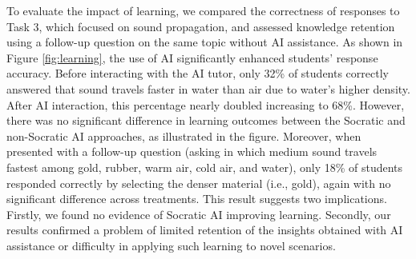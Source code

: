 \documentclass[
  11pt,
]{article}
\begin{document}
To evaluate the impact of learning, we compared the correctness of responses to Task 3, which focused on sound propagation, and assessed knowledge retention using a follow-up question on the same topic without AI assistance. As shown in Figure \ref{fig:learning}, the use of AI significantly enhanced students' response accuracy. Before interacting with the AI tutor, only 32\% of students correctly answered that sound travels faster in water than air due to water's higher density. After AI interaction, this percentage nearly doubled increasing to 68\%. However, there was no significant difference in learning outcomes between the Socratic and non-Socratic AI approaches, as illustrated in the figure. Moreover, when presented with a follow-up question (asking in which medium sound travels fastest among gold, rubber, warm air, cold air, and water), only 18\% of students responded correctly by selecting the denser material (i.e., gold), again with no significant difference across treatments. This result suggests two implications. Firstly, we found no evidence of Socratic AI improving learning. Secondly, our results confirmed a problem of limited retention of the insights obtained with AI assistance or difficulty in applying such learning to novel scenarios.
\end{document}
